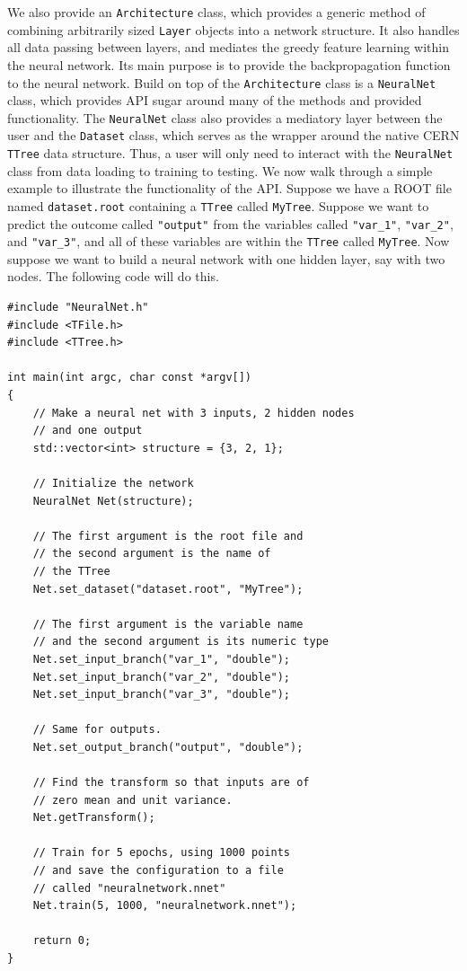 We also provide an \texttt{Architecture} class, which provides a generic method of combining arbitrarily sized \texttt{Layer} objects into a network structure. It also handles all data passing between layers, and mediates the greedy feature learning within the neural network. Its main purpose is to provide the backpropagation function to the neural network. Build on top of the \texttt{Architecture} class is a \texttt{NeuralNet} class, which provides API sugar around many of the methods and provided functionality. The \texttt{NeuralNet} class also provides a mediatory layer between the user and the \texttt{Dataset} class, which serves as the wrapper around the native CERN \texttt{TTree} data structure. Thus, a user will only need to interact with the \texttt{NeuralNet} class from data loading to training to testing. We now walk through a simple example to illustrate the functionality of the API. Suppose we have a ROOT file named \texttt{dataset.root} containing a \texttt{TTree} called \texttt{MyTree}. Suppose we want to predict the outcome called \texttt{"output"} from the variables called \texttt{"var\_1"}, \texttt{"var\_2"}, and \texttt{"var\_3"}, and all of these variables are within the \texttt{TTree} called \texttt{MyTree}. Now suppose we want to build a neural network with one hidden layer, say with two nodes. The following code will do this. 

\begin{small}
\begin{verbatim}
#include "NeuralNet.h"
#include <TFile.h>
#include <TTree.h>

int main(int argc, char const *argv[])
{
    // Make a neural net with 3 inputs, 2 hidden nodes
    // and one output
    std::vector<int> structure = {3, 2, 1};

    // Initialize the network
    NeuralNet Net(structure);

    // The first argument is the root file and
    // the second argument is the name of 
    // the TTree
    Net.set_dataset("dataset.root", "MyTree");

    // The first argument is the variable name
    // and the second argument is its numeric type
    Net.set_input_branch("var_1", "double");
    Net.set_input_branch("var_2", "double");
    Net.set_input_branch("var_3", "double");

    // Same for outputs.
    Net.set_output_branch("output", "double");

    // Find the transform so that inputs are of
    // zero mean and unit variance.
    Net.getTransform();

    // Train for 5 epochs, using 1000 points
    // and save the configuration to a file
    // called "neuralnetwork.nnet"
    Net.train(5, 1000, "neuralnetwork.nnet");

    return 0;
}

\end{verbatim}
\end{small}

